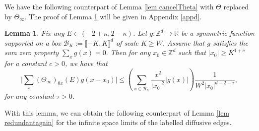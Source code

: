 \documentclass{article}
\newcommand{\1}{\mathds{1}}
\numberwithin{equation}{section}
\renewcommand{\cal}{\mathcal}
\renewcommand{\leq}{\leqslant}
\renewcommand{\geq}{\geqslant}
\renewcommand{\le}{\leq}
\renewcommand{\ge}{\geq}
\newcommand{\R}{\mathbb{R}}
\newcommand{\Z}{\mathbb{Z}}
\newcommand{\dashed}{\text{diffusive}}
\theoremstyle{plain} %
\newtheorem{lemma}[theorem]{Lemma}
\theoremstyle{remark}
\newcommand{\Sinfty}{\Sigma^{\infty}}
\begin{document}

We have the following counterpart of Lemma \ref{lem cancelTheta} with $\Theta$ replaced by $\Theta_\infty$. The proof of Lemma \ref{lem cancelTheta2} will be given in Appendix \ref{appd}.
 

\begin{lemma}\label{lem cancelTheta2}
Fix any $E\in (-2+\kappa,2-\kappa)$. Let $g:\Z^d \to \R$ be a symmetric function supported on a box $\cal B_K:=\llbracket -K,K\rrbracket^d$ of scale $K\ge W$. Assume that $g$ satisfies the sum zero property $\sum_{x}g(x)=0.$ Then for any $x_0\in \Z^d$ such that $|x_0| \ge K^{1+c}$ for a constant $c>0$, we have that
$$\Big|\sum_{x} (\Theta_\infty)_{0  x }(E) g(x-x_0)\Big| \le   \left(\sum_{x\in \cal B_K}\frac{x^2}{|x_0|^2}|g(x)|\right)  \frac{1}{W^2 |x_0|^{d-2-\tau}},$$ %
for any constant $\tau >0$.
\end{lemma}

With this lemma, we can obtain the following counterpart of Lemma \ref{lem redundantagain}  for the infinite space limits of the labelled $\dashed$ edges. 
\end{document}
